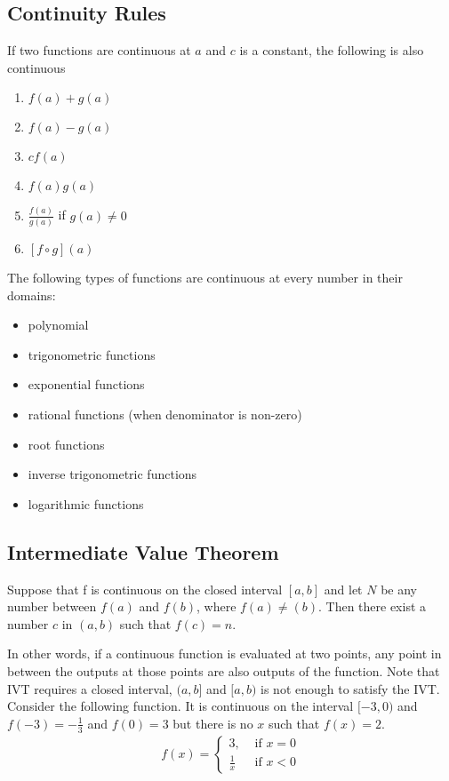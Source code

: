 \documentclass{article}
\theoremstyle{mytheoremstyle}
\theoremstyle{mytheoremstyle}
\theoremstyle{myproblemstyle}
\begin{document}
    \subsection*{Continuity Rules}
    If two functions are continuous at $a$ and $c$ is a constant, the following
    is also continuous
    \begin{enumerate}
        \item $f(a)+g(a)$
        \item $f(a)-g(a)$
        \item $cf(a)$
        \item $f(a)g(a)$
        \item $ \frac{f(a)}{g(a)} $ if $g(a)\ne0$
        \item $[f\circ g](a)$
    \end{enumerate}

    The following types of functions are continuous at every number in their
    domains:
    \begin{itemize}
        \item polynomial
        \item trigonometric functions
        \item exponential functions
        \item rational functions (when denominator is non-zero)
        \item root functions
        \item inverse trigonometric functions
        \item logarithmic functions
    \end{itemize}

    \subsection*{Intermediate Value Theorem}
    \begin{theorem}
        Suppose that f is continuous on the closed interval $[a,b]$ and let $N$
        be any number between $f(a)$ and $f(b)$, where $f(a)\ne (b)$. Then there
        exist a number $c$ in $(a,b)$ such that $f(c) = n$.
    \end{theorem}
    In other words, if a continuous function is evaluated at two points, any
    point in between the outputs at those points are also outputs of the
    function. Note that IVT requires a closed interval, $(a,b]$ and $[a, b)$ is
    not enough to satisfy the IVT. \\
    Consider the following function. It is continuous on the interval $[-3,0)$
    and $f(-3)= -\frac{1}{3}$ and $f(0) = 3$ but there is no $x$ such that
    $f(x)=2$.
    \begin{align*}
        f(x) = \begin{cases}
            3, &\text{ if } x = 0\\
            \frac{1}{x} &\text{ if } x<0 
        \end{cases}
    \end{align*}
\end{document}
